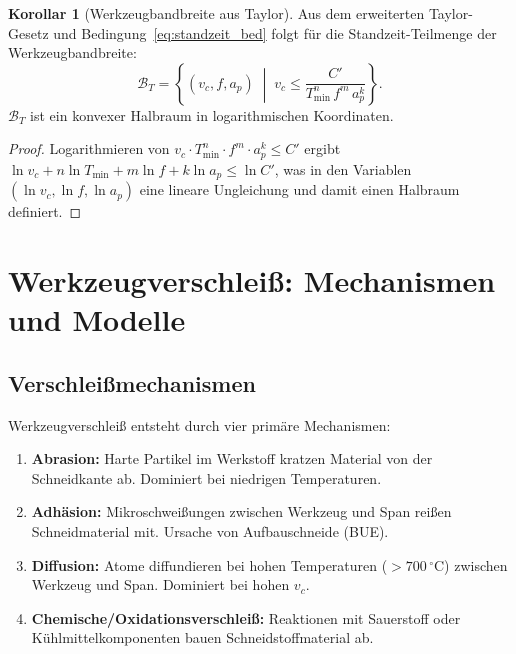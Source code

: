﻿\documentclass[a4paper,12pt]{article}
\theoremstyle{definition}
\newtheorem{korollar}{Korollar}
\begin{document}
\begin{korollar}[Werkzeugbandbreite aus Taylor]
  Aus dem erweiterten Taylor-Gesetz und Bedingung~\eqref{eq:standzeit_bed} folgt
  für die Standzeit-Teilmenge der Werkzeugbandbreite:
  \[
    \mathcal{B}_T = \left\{(v_c, f, a_p) \;\middle|\; v_c \leq \frac{C'}{T_{\min}^n \, f^m \, a_p^k}\right\}.
  \]
  $\mathcal{B}_T$ ist ein konvexer Halbraum in logarithmischen Koordinaten.
\end{korollar}

\begin{proof}
  Logarithmieren von $v_c \cdot T_{\min}^n \cdot f^m \cdot a_p^k \leq C'$ ergibt
  $\ln v_c + n \ln T_{\min} + m \ln f + k \ln a_p \leq \ln C'$, was in den
  Variablen $(\ln v_c, \ln f, \ln a_p)$ eine lineare Ungleichung und damit einen
  Halbraum definiert. \qedhere
\end{proof}

\section{Werkzeugverschleiß: Mechanismen und Modelle}
\label{sec:verschleiss}

\subsection{Verschleißmechanismen}

Werkzeugverschleiß entsteht durch vier primäre Mechanismen:

\begin{enumerate}
  \item \textbf{Abrasion:} Harte Partikel im Werkstoff kratzen Material von der
        Schneidkante ab. Dominiert bei niedrigen Temperaturen.
  \item \textbf{Adhäsion:} Mikroschweißungen zwischen Werkzeug und Span reißen
        Schneidmaterial mit. Ursache von Aufbauschneide (BUE).
  \item \textbf{Diffusion:} Atome diffundieren bei hohen Temperaturen
        ($>700\,^{\circ}\mathrm{C}$) zwischen Werkzeug und Span. Dominiert bei
        hohen $v_c$.
  \item \textbf{Chemische/Oxidationsverschleiß:} Reaktionen mit Sauerstoff oder
        Kühlmittelkomponenten bauen Schneidstoffmaterial ab.
\end{enumerate}
\end{document}
